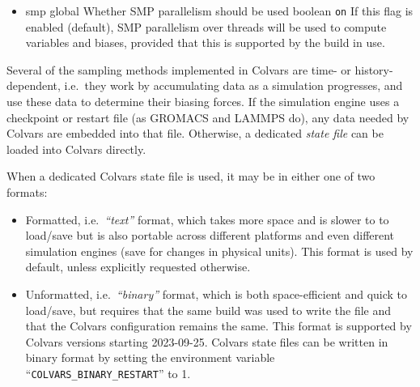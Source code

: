 \begin{itemize}
\item %
  \keydef
    {smp}{%
    global}{%
    Whether SMP parallelism should be used}{%
    boolean}{%
    \texttt{on}}{%
    If this flag is enabled (default), SMP parallelism over threads will be used to compute variables and biases, provided that this is supported by the \MDENGINE{} build in use.}

\ifdefined{}\fi

\end{itemize}



Several of the sampling methods implemented in Colvars are time- or history-dependent, i.e.\ they work by accumulating data as a simulation progresses, and use these data to determine their biasing forces.  If the simulation engine uses a checkpoint or restart file (as GROMACS and LAMMPS do), any data needed by Colvars are embedded into that file.  Otherwise, a dedicated \emph{state file} can be loaded into Colvars directly.

When a dedicated Colvars state file is used, it may be in either one of two formats:
\begin{itemize}

\item Formatted, i.e.\ \emph{``text''} format, which takes more space and is slower to to load/save but is also portable across different platforms and even different simulation engines (save for changes in physical units).  This format is used by default, unless explicitly requested otherwise.

\item Unformatted, i.e.\ \emph{``binary''} format, which is both space-efficient and quick to load/save, but requires that the same \MDENGINE{} build was used to write the file and that the Colvars configuration remains the same. This format is supported by Colvars versions starting 2023-09-25.
Colvars state files can be written in binary format by setting the environment variable ``\texttt{COLVARS\_BINARY\_RESTART}'' to 1.

\end{itemize}


